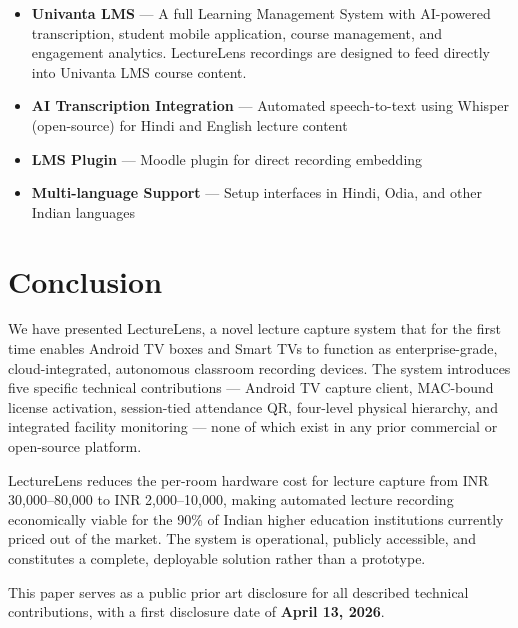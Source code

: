 \documentclass[12pt,a4paper]{article}
\begin{document}
\begin{itemize}
    \item \textbf{Univanta LMS} — A full Learning Management System with AI-powered transcription, student mobile application, course management, and engagement analytics. LectureLens recordings are designed to feed directly into Univanta LMS course content.
    \item \textbf{AI Transcription Integration} — Automated speech-to-text using Whisper (open-source) for Hindi and English lecture content
    \item \textbf{LMS Plugin} — Moodle plugin for direct recording embedding
    \item \textbf{Multi-language Support} — Setup interfaces in Hindi, Odia, and other Indian languages
\end{itemize}

\section{Conclusion}

We have presented LectureLens, a novel lecture capture system that for the first time enables Android TV boxes and Smart TVs to function as enterprise-grade, cloud-integrated, autonomous classroom recording devices. The system introduces five specific technical contributions — Android TV capture client, MAC-bound license activation, session-tied attendance QR, four-level physical hierarchy, and integrated facility monitoring — none of which exist in any prior commercial or open-source platform.

LectureLens reduces the per-room hardware cost for lecture capture from INR 30{,}000--80{,}000 to INR 2{,}000--10{,}000, making automated lecture recording economically viable for the 90\% of Indian higher education institutions currently priced out of the market. The system is operational, publicly accessible, and constitutes a complete, deployable solution rather than a prototype.

This paper serves as a public prior art disclosure for all described technical contributions, with a first disclosure date of \textbf{April 13, 2026}.
\end{document}
